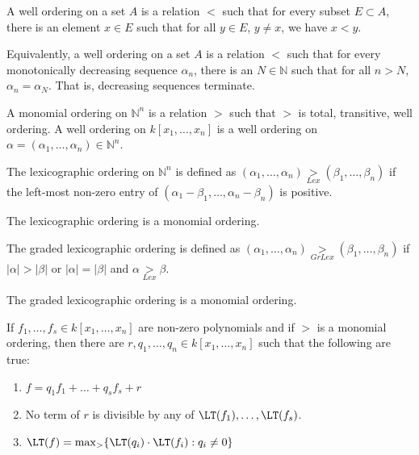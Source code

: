             \begin{definition}
                A well ordering on a set $A$ is a relation $<$
                such that for every subset $E\subset A$, there is an
                element $x\in E$ such that for all $y\in E$, $y\ne x$,
                we have $x<y$.
            \end{definition}
            Equivalently, a well ordering on a set $A$ is a relation $<$ such
            that for every monotonically decreasing sequence $\alpha_n$, there
            is an $N\in \mathbb{N}$ such that for all $n>N$,
            $\alpha_{n}=\alpha_{N}$. That is, decreasing sequences terminate.
            \begin{definition}
                A monomial ordering on $\mathbb{N}^n$ is a relation
                $>$ such that $>$ is total, transitive, well
                ordering. A well ordering on $k[x_1,\hdots ,x_n]$
                is a well ordering on
                $\alpha=(\alpha_1,\hdots,\alpha_n)\in\mathbb{N}^n$.
            \end{definition}
            \begin{definition}
                The lexicographic ordering on $\mathbb{N}^n$ is
                defined as
                $(\alpha_1,\hdots,\alpha_n)\underset{Lex}{>}%
                 (\beta_1,\hdots,\beta_n)$
                if the left-most non-zero entry of
                $(\alpha_1-\beta_1,\hdots, \alpha_n-\beta_n)$
                is positive.
            \end{definition}
            \begin{theorem}
                The lexicographic ordering is a monomial ordering.
            \end{theorem}
            \begin{definition}
                The graded lexicographic ordering is defined as
                $(\alpha_1,\hdots,\alpha_n)\underset{GrLex}{>}%
                 (\beta_1,\hdots, \beta_n)$
                if $|\alpha|>|\beta|$ or $|\alpha|=|\beta|$
                and $\alpha\underset{Lex}{>}\beta$.
            \end{definition}
            \begin{theorem}
                The graded lexicographic ordering is a monomial ordering.
            \end{theorem}
            \begin{theorem}
                If $f_1,\hdots, f_s\in k[x_1,\hdots ,x_n]$ are
                non-zero polynomials and if $>$ is a monomial ordering,
                then there are $r,q_1,\hdots, q_n\in k[x_1,\hdots ,x_n]$
                such that the following are true:
                \begin{enumerate}
                    \item $f=q_{1}f_{1}+\hdots+q_{s}f_{s}+r$
                    \item No term of $r$ is divisible by
                          any of $\LT(f_{1}),\hdots,\LT(f_{s})$.
                    \item $\LT(f)=\max_{>}\{\LT(q_{i})%
                           \cdot\LT(f_i):q_i\ne{0}\}$
                \end{enumerate}
            \end{theorem}
